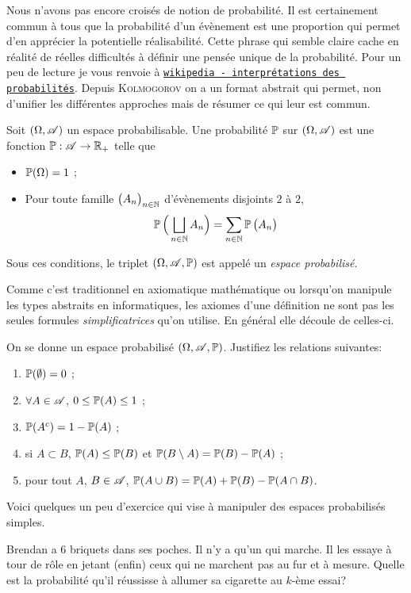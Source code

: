\documentclass[11pt, a4paper]{article}
\begin{document}
Nous n'avons pas encore croisés de notion de probabilité. Il est
certainement commun à tous que la probabilité d'un évènement est une
proportion qui permet d'en apprécier la potentielle
réalisabilité. Cette phrase qui semble claire cache en réalité de
réelles difficultés à définir une pensée unique de la
probabilité. Pour un peu de lecture je vous renvoie à
\href{https://en.wikipedia.org/wiki/Probability\_interpretations}{\texttt{wikipedia
    - interprétations des probabilités}}.  Depuis \textsc{Kolmogorov}
on a un format abstrait qui permet, non d'unifier les différentes
approches mais de résumer ce qui leur est commun.
\begin{defn}
  Soit $(\Omega, \mathscr{A})$ un espace probabilisable. Une probabilité
  $\operatorname{\mathbb{P}}$ sur $(\Omega, \mathscr{A})$ est une fonction
  $\operatorname{\mathbb{P}} : \mathscr{A} \rightarrow \mathbb{R}_+$ telle que
  \begin{itemize}
  \item $\operatorname{\mathbb{P}}(\Omega) = 1$ ;
  \item Pour toute famille $\big(A_n\big)_{n\in \mathbb{N}}$ d'évènements
    disjoints $2$ à $2$,
    \[
      \operatorname{\mathbb{P}}\Big(\bigsqcup_{n \in \mathbb{N}} A_n\Big) = \sum_{n \in \mathbb{N}} \operatorname{\mathbb{P}}\big(A_n\big)
    \]
  \end{itemize}
  Sous ces conditions, le triplet $(\Omega, \mathscr{A}, \operatorname{\mathbb{P}})$ est appelé un
  \emph{espace probabilisé}.
\end{defn}
Comme c'est traditionnel en axiomatique mathématique ou lorsqu'on
manipule les types abstraits en informatiques, les axiomes d'une
définition ne sont pas les seules formules \textit{simplificatrices}
qu'on utilise. En général elle découle de celles-ci.
\begin{question}
  On se donne un espace probabilisé $(\Omega, \mathscr{A}, \operatorname{\mathbb{P}})$. Justifiez
  les relations suivantes:
  \begin{enumerate}
  \item $\operatorname{\mathbb{P}}(\emptyset) = 0$ ;
  \item $\forall A \in \mathscr{A}$, $0 \leq \operatorname{\mathbb{P}}(A) \leq 1$ ;
  \item $\operatorname{\mathbb{P}}(A^c) = 1 - \operatorname{\mathbb{P}}(A)$ ;
  \item si $A \subset B$, $\operatorname{\mathbb{P}}(A) \leq \operatorname{\mathbb{P}}(B)$ et
    $\operatorname{\mathbb{P}}(B \setminus A) = \operatorname{\mathbb{P}}(B) - \operatorname{\mathbb{P}}(A)$ ;
  \item pour tout $A$, $B \in \mathscr{A}$,
    $\operatorname{\mathbb{P}}(A\cup B) = \operatorname{\mathbb{P}}(A) + \operatorname{\mathbb{P}}(B) - \operatorname{\mathbb{P}}(A\cap B)$.
  \end{enumerate}
\end{question}
Voici quelques un peu d'exercice qui vise à manipuler des espaces
probabilisés simples.
\begin{question}
  \label{q:brendan}
  Brendan a $6$ briquets dans ses poches. Il n'y a qu'un qui
  marche. Il les essaye à tour de rôle en jetant (enfin) ceux qui ne
  marchent pas au fur et à mesure. Quelle est la probabilité qu'il
  réussisse à allumer sa cigarette au $k$-ème essai?
\end{question}
\end{document}
